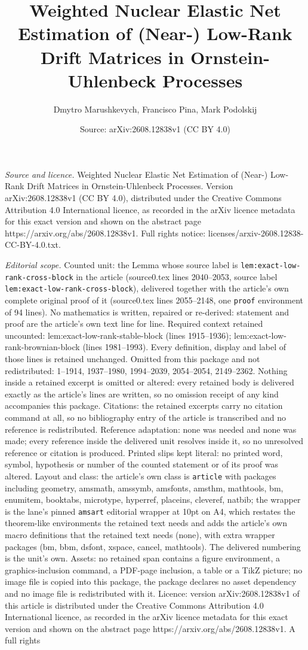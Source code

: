 \documentclass[10pt,a4paper]{amsart}
\title[Weighted Nuclear Elastic Net Estimation of (Near-) Low-Rank ]{Weighted Nuclear Elastic Net Estimation of (Near-) Low-Rank Drift Matrices in Ornstein-Uhlenbeck Processes}
\author{Dmytro Marushkevych, Francisco Pina, Mark Podolskij}
\date{Source: arXiv:2608.12838v1 (CC BY 4.0)}
\begin{document}
\maketitle

\noindent\emph{Source and licence.} Weighted Nuclear Elastic Net Estimation of (Near-) Low-Rank Drift Matrices in Ornstein-Uhlenbeck Processes. Version arXiv:2608.12838v1 (CC BY 4.0), distributed under the Creative Commons Attribution 4.0 International licence, as recorded in the arXiv licence metadata for this exact version and shown on the abstract page https://arxiv.org/abs/2608.12838v1. Full rights notice: licenses/arxiv-2608.12838-CC-BY-4.0.txt.\par\smallskip

\noindent\textit{Editorial scope.} Counted unit: the Lemma whose source label is \texttt{lem:exact-low-rank-cross-block} in the article (source0.tex lines 2040--2053, source label \texttt{lem:exact-low-rank-cross-block}), delivered together with the article's own complete original proof of it (source0.tex lines 2055--2148, one \texttt{proof} environment of 94 lines). No mathematics is written, repaired or re-derived: statement and proof are the article's own text line for line. Required context retained uncounted: lem:exact-low-rank-stable-block (lines 1915--1936); lem:exact-low-rank-brownian-block (lines 1981--1993). Every definition, display and label of those lines is retained unchanged. Omitted from this package and not redistributed: 1--1914, 1937--1980, 1994--2039, 2054--2054, 2149--2362. Nothing inside a retained excerpt is omitted or altered: every retained body is delivered exactly as the article's lines are written, so no omission receipt of any kind accompanies this package. Citations: the retained excerpts carry no citation command at all, so no bibliography entry of the article is transcribed and no reference is redistributed. Reference adaptation: none was needed and none was made; every reference inside the delivered unit resolves inside it, so no unresolved reference or citation is produced. Printed slips kept literal: no printed word, symbol, hypothesis or number of the counted statement or of its proof was altered. Layout and class: the article's own class is \texttt{article} with packages including geometry, amsmath, amssymb, amsfonts, amsthm, mathtools, bm, enumitem, booktabs, microtype, hyperref, placeins, cleveref, natbib; the wrapper is the lane's pinned \texttt{amsart} editorial wrapper at 10pt on A4, which restates the theorem-like environments the retained text needs and adds the article's own macro definitions that the retained text needs (none), with extra wrapper packages (bm, bbm, dsfont, xspace, cancel, mathtools). The delivered numbering is the unit's own. Assets: no retained span contains a figure environment, a graphics-inclusion command, a PDF-page inclusion, a table or a TikZ picture; no image file is copied into this package, the package declares no asset dependency and no image file is redistributed with it. Licence: version arXiv:2608.12838v1 of this article is distributed under the Creative Commons Attribution 4.0 International licence, as recorded in the arXiv licence metadata for this exact version and shown on the abstract page https://arxiv.org/abs/2608.12838v1. A full rights 
\end{document}
